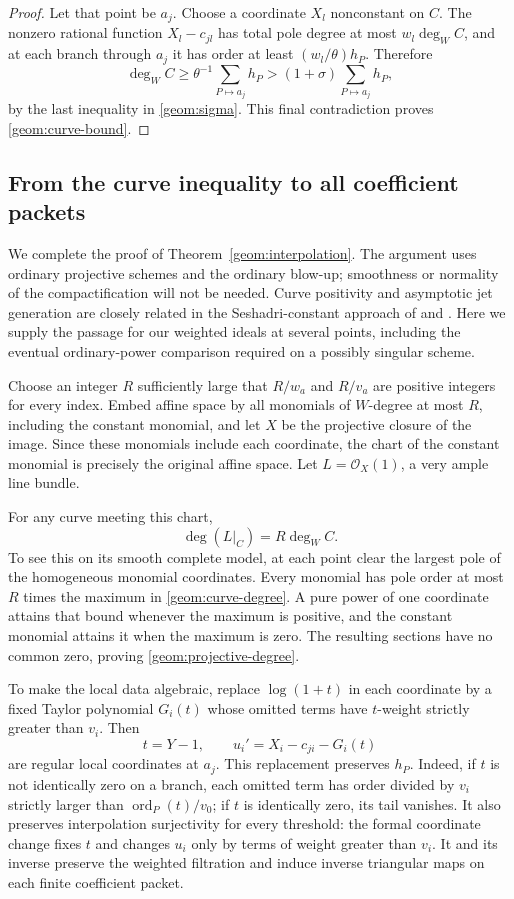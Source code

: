 \begin{proof}
Let that point be $a_j$. Choose a coordinate $X_l$ nonconstant on
$C$. The nonzero rational function $X_l-c_{jl}$ has total pole degree
at most $w_l\deg_W C$, and at each branch through $a_j$ it has order
at least $(w_l/\theta)h_P$. Therefore
\[
 \deg_W C\ge\theta^{-1}\sum_{P\mapsto a_j}h_P
             >(1+\sigma)\sum_{P\mapsto a_j}h_P,
\]
by the last inequality in \eqref{geom:sigma}. This final contradiction
proves \eqref{geom:curve-bound}.
\end{proof}

\subsection{From the curve inequality to all coefficient packets}

We complete the proof of Theorem~\ref{geom:interpolation}. The argument uses
ordinary projective schemes and the ordinary blow-up; smoothness or
normality of the compactification will not be needed. Curve positivity
and asymptotic jet generation are closely related in the Seshadri-constant
approach of \cite[Section~6]{demailly1992} and \cite{fischlernakamaye2014}. Here we supply the passage
for our weighted ideals at several points, including the eventual
ordinary-power comparison required on a possibly singular scheme.

Choose an integer $R$ sufficiently large that $R/w_a$ and $R/v_a$ are
positive integers for every index. Embed affine space by all monomials
of $W$-degree at most $R$, including the constant monomial, and let
$X$ be the projective closure of the image. Since these monomials
include each coordinate, the chart of the constant monomial is
precisely the original affine space. Let $L=\mathcal O_X(1)$, a very
ample line bundle.

For any curve meeting this chart,
\begin{equation}
\label{geom:projective-degree}
 \deg(L|_C)=R\deg_W C.
\end{equation}
To see this on its smooth complete model, at each point clear the
largest pole of the homogeneous monomial coordinates. Every monomial
has pole order at most $R$ times the maximum in
\eqref{geom:curve-degree}. A pure power of one coordinate attains
that bound whenever the maximum is positive, and the constant
monomial attains it when the maximum is zero. The resulting sections
have no common zero, proving \eqref{geom:projective-degree}.

To make the local data algebraic, replace $\log(1+t)$ in each
coordinate by a fixed Taylor polynomial $G_i(t)$ whose omitted
terms have $t$-weight strictly greater than $v_i$. Then
\[
 t=Y-1,\qquad u_i'=X_i-c_{ji}-G_i(t)
\]
are regular local coordinates at $a_j$. This replacement preserves
$h_P$. Indeed, if $t$ is not identically zero on a branch, each
omitted term has order divided by $v_i$ strictly larger than
$\operatorname{ord}_P(t)/v_0$; if $t$ is identically zero, its tail
vanishes. It also preserves interpolation surjectivity for every
threshold: the formal coordinate change fixes $t$ and changes
$u_i$ only by terms of weight greater than $v_i$. It and its inverse
preserve the weighted filtration and induce inverse triangular maps
on each finite coefficient packet.

